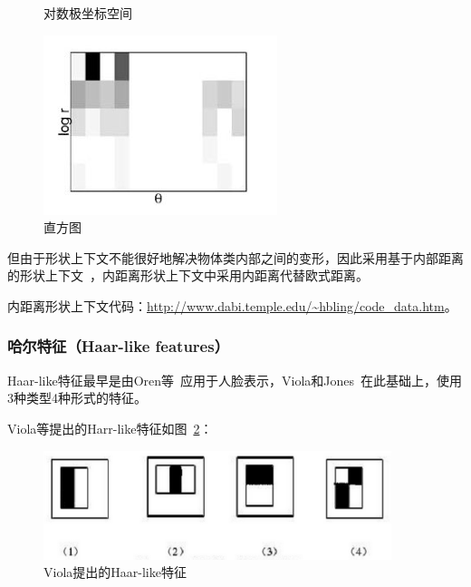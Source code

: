 \documentclass[12pt]{article}
\begin{document}
\begin{enumerate}
\begin{figure}
\begin{minipage}[t]{0.4\linewidth}
              \caption{对数极坐标空间}
              \label{fig:log}
              \end{minipage}
              \begin{minipage}[t]{0.47\linewidth}
              \centering
              \includegraphics[width=0.6\linewidth]{his}
              \caption{直方图}
              \label{fig:his}
              \end{minipage}
            \end{figure}  
    \end{enumerate}
    但由于形状上下文不能很好地解决物体类内部之间的变形，因此采用基于内部距离的形状上下文~\cite{ling2007shape}，内距离形状上下文中采用内距离代替欧式距离。
    
{\color{blue}内距离形状上下文代码}：\url{http://www.dabi.temple.edu/~hbling/code_data.htm}。


\subsubsection{哈尔特征（Haar-like features）}

Haar-like特征最早是由Oren等~\cite{oren1997pedestrian}应用于人脸表示，Viola和Jones~\cite{viola2001rapid}在此基础上，使用3种类型4种形式的特征。

Viola等提出的Harr-like特征如图~\ref{fig: Viola_Haar-like}：

\begin{figure}[!ht]
\centering
\includegraphics[width=4in]{Viola_Haar-like}
\caption{Viola提出的Haar-like特征}
\label{fig: Viola_Haar-like}
\end{figure}
\end{document}
